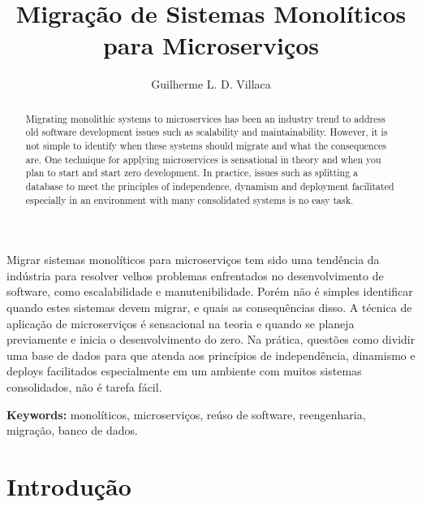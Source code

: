 \documentclass[12pt]{article}
\title{Migração de Sistemas Monolíticos para Microserviços}
\author{Guilherme L. D. Villaca\inst{1}}
\begin{document}
 

\maketitle

\begin{abstract}
Migrating monolithic systems to microservices has been an industry trend to address old software development issues such as scalability and maintainability. However, it is not simple to identify when these systems should migrate and what the consequences are. One technique for applying microservices is sensational in theory and when you plan to start and start zero development. In practice, issues such as splitting a database to meet the principles of independence, dynamism and deployment facilitated especially in an environment with many consolidated systems is no easy task.
\end{abstract}
     
\begin{resumo} 
Migrar sistemas monolíticos para microserviços tem sido uma tendência da indústria para resolver velhos problemas enfrentados no desenvolvimento de software, como escalabilidade e manutenibilidade. Porém não é simples identificar quando estes sistemas devem migrar, e quais as consequências disso. A técnica de aplicação de microserviços é sensacional na teoria e quando se planeja previamente e inicia o desenvolvimento do zero. Na prática, questões como dividir uma base de dados para que atenda aos princípios de independência, dinamismo e deploys facilitados especialmente em um ambiente com muitos sistemas consolidados, não é tarefa fácil.
\end{resumo}

{\bf Keywords:} monolíticos, microserviços, reúso de software, reengenharia, migração, banco de dados.


\section{Introdução}

\end{document}

